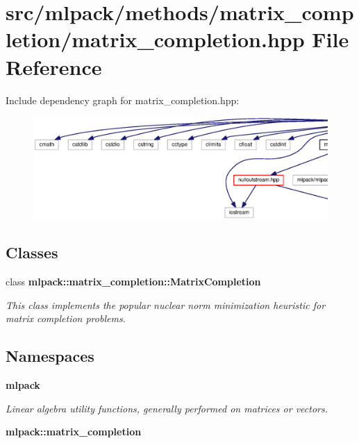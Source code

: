 \section{src/mlpack/methods/matrix\+\_\+completion/matrix\+\_\+completion.hpp File Reference}
\label{matrix__completion_8hpp}
Include dependency graph for matrix\+\_\+completion.\+hpp\+:
\nopagebreak
\begin{figure}[H]
\begin{center}
\leavevmode
\includegraphics[width=350pt]{matrix__completion_8hpp__incl}
\end{center}
\end{figure}
\subsection*{Classes}
\begin{DoxyCompactItemize}
\item 
class {\bf mlpack\+::matrix\+\_\+completion\+::\+Matrix\+Completion}
\begin{DoxyCompactList}\small\item\em This class implements the popular nuclear norm minimization heuristic for matrix completion problems. \end{DoxyCompactList}\end{DoxyCompactItemize}
\subsection*{Namespaces}
\begin{DoxyCompactItemize}
\item 
 {\bf mlpack}
\begin{DoxyCompactList}\small\item\em Linear algebra utility functions, generally performed on matrices or vectors. \end{DoxyCompactList}\item 
 {\bf mlpack\+::matrix\+\_\+completion}
\end{DoxyCompactItemize}


